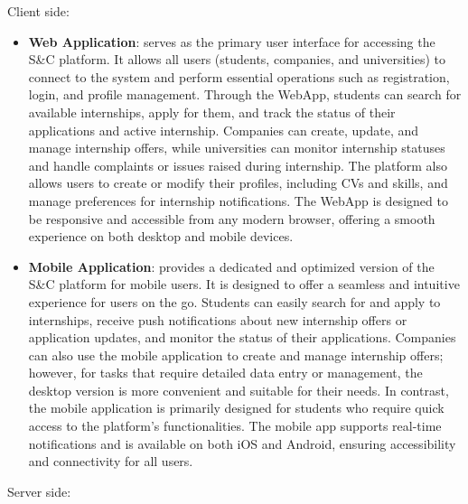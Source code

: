 Client side: 
\begin{itemize}
    \item \textbf{Web Application}: serves as the primary user interface for accessing the S\&C platform. It allows all users (students, companies, and universities) to connect to the system and perform essential operations such as registration, login, and profile management. Through the WebApp, students can search for available internships, apply for them, and track the status of their applications and active internship. Companies can create, update, and manage internship offers, while universities can monitor internship statuses and handle complaints or issues raised during internship. The platform also allows users to create or modify their profiles, including CVs and skills, and manage preferences for internship notifications. The WebApp is designed to be responsive and accessible from any modern browser, offering a smooth experience on both desktop and mobile devices.
    \item \textbf{Mobile Application}: provides a dedicated and optimized version of the S\&C platform for mobile users. It is designed to offer a seamless and intuitive experience for users on the go. Students can easily search for and apply to internships, receive push notifications about new internship offers or application updates, and monitor the status of their applications. Companies can also use the mobile application to create and manage internship offers; however, for tasks that require detailed data entry or management, the desktop version is more convenient and suitable for their needs. In contrast, the mobile application is primarily designed for students who require quick access to the platform’s functionalities. The mobile app supports real-time notifications and is available on both iOS and Android, ensuring accessibility and connectivity for all users.
\end{itemize}
Server side:

